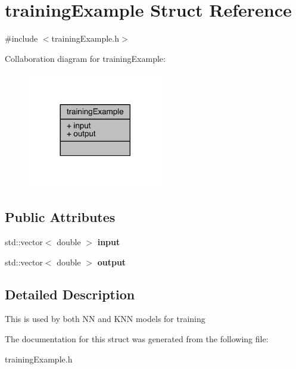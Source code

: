 \hypertarget{structtraining_example}{}\section{training\+Example Struct Reference}
\label{structtraining_example}


{\ttfamily \#include $<$training\+Example.\+h$>$}



Collaboration diagram for training\+Example\+:
\nopagebreak
\begin{figure}[H]
\begin{center}
\leavevmode
\includegraphics[width=168pt]{structtraining_example__coll__graph}
\end{center}
\end{figure}
\subsection*{Public Attributes}
\begin{DoxyCompactItemize}
\item 
\mbox{\label{structtraining_example_a066378f49152305e496c0f76fb13246d}} 
std\+::vector$<$ double $>$ {\bfseries input}
\item 
\mbox{\label{structtraining_example_ae776963ea692ba5260d4d329f579c9fd}} 
std\+::vector$<$ double $>$ {\bfseries output}
\end{DoxyCompactItemize}


\subsection{Detailed Description}
This is used by both NN and K\+NN models for training 

The documentation for this struct was generated from the following file\+:\begin{DoxyCompactItemize}
\item 
training\+Example.\+h\end{DoxyCompactItemize}
